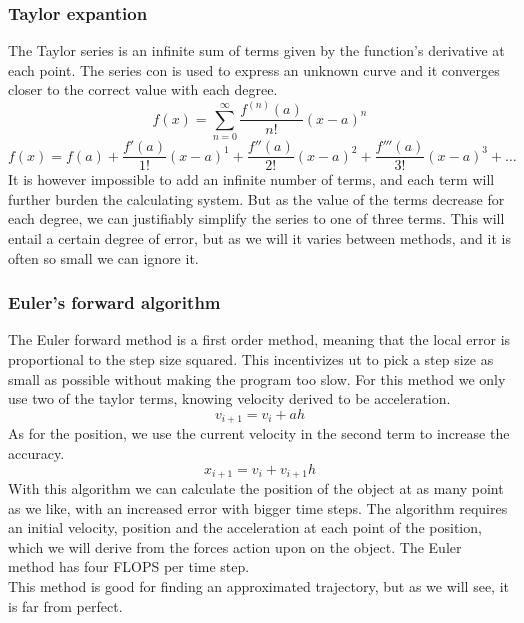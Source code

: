 \documentclass[10pt]{article}
\begin{document}
\begin{multicols}{2}
\subsubsection{Taylor expantion}
The Taylor series is an infinite sum of terms given by the function's derivative at each point. The series con is used to express an unknown curve and it converges closer to the correct value with each degree. 
\begin{equation}
   f(x) =  \sum_{n=0}^\infty\frac{f^{(n)}(a)}{n!}(x-a)^n
\end{equation}
\begin{equation}
    f(x) = f(a)+ \frac{f'(a)}{1!}(x-a)^1+\frac{f''(a)}{2!}(x-a)^2+\frac{f'''(a)}{3!}(x-a)^3+\dots
\end{equation}
It is however impossible to add an infinite number of terms, and each term will further burden the calculating system. But as the value of the terms decrease for each degree, we can justifiably simplify the series to one of three terms. This will entail a certain degree of error, but as we will  it varies between methods, and it is often so small we can ignore it.
\subsubsection{Euler's forward algorithm}
The Euler forward method is a first order method, meaning that the local error is proportional to the step size squared. This incentivizes ut to pick a step size as small as possible without making the program too slow. For this method we only use two of the taylor terms, knowing velocity derived to be acceleration.
\begin{equation}
    v_{i+1} = v_i +ah
\end{equation}
As for the position, we use the current velocity in the second term to increase the accuracy.
\begin{equation}
    x_{i+1} = v_i +v_{i+1}h
\end{equation}
With this algorithm we can calculate the position of the object at as many point as we like, with an increased error with bigger time steps. The algorithm requires an initial velocity, position and the acceleration at each point of the position, which we will derive from the forces action upon on the object. The Euler method has four FLOPS per time step.\\

This method is good for finding an approximated trajectory, but as we will see, it is far from perfect.



\end{multicols}
\end{document}
